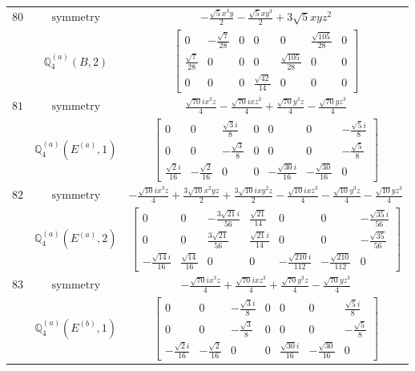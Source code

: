 \documentclass[fleqn,8pt,landscape]{jsarticle}
\begin{document}
\begin{longtable}{ccc}
$ 80 $ & $ \text{symmetry} $ & $ - \frac{\sqrt{5} x^{3} y}{2} - \frac{\sqrt{5} x y^{3}}{2} + 3 \sqrt{5} x y z^{2} $ \\
$  $ & $ \mathbb{Q}_{4}^{(a)}(B,2) $ & $ \begin{bmatrix} 0 & - \frac{\sqrt{7}}{28} & 0 & 0 & 0 & \frac{\sqrt{105}}{28} & 0 \\ \frac{\sqrt{7}}{28} & 0 & 0 & 0 & \frac{\sqrt{105}}{28} & 0 & 0 \\ 0 & 0 & 0 & \frac{\sqrt{42}}{14} & 0 & 0 & 0 \end{bmatrix} $ \\ \hline
$ 81 $ & $ \text{symmetry} $ & $ \frac{\sqrt{70} i x^{3} z}{4} - \frac{\sqrt{70} i x z^{3}}{4} + \frac{\sqrt{70} y^{3} z}{4} - \frac{\sqrt{70} y z^{3}}{4} $ \\
$  $ & $ \mathbb{Q}_{4}^{(a)}(E^{(a)},1) $ & $ \begin{bmatrix} 0 & 0 & \frac{\sqrt{3} i}{8} & 0 & 0 & 0 & - \frac{\sqrt{5} i}{8} \\ 0 & 0 & - \frac{\sqrt{3}}{8} & 0 & 0 & 0 & - \frac{\sqrt{5}}{8} \\ \frac{\sqrt{2} i}{16} & - \frac{\sqrt{2}}{16} & 0 & 0 & - \frac{\sqrt{30} i}{16} & - \frac{\sqrt{30}}{16} & 0 \end{bmatrix} $ \\ \hline
$ 82 $ & $ \text{symmetry} $ & $ - \frac{\sqrt{10} i x^{3} z}{4} + \frac{3 \sqrt{10} x^{2} y z}{2} + \frac{3 \sqrt{10} i x y^{2} z}{2} - \frac{\sqrt{10} i x z^{3}}{4} - \frac{\sqrt{10} y^{3} z}{4} - \frac{\sqrt{10} y z^{3}}{4} $ \\
$  $ & $ \mathbb{Q}_{4}^{(a)}(E^{(a)},2) $ & $ \begin{bmatrix} 0 & 0 & - \frac{3 \sqrt{21} i}{56} & \frac{\sqrt{21}}{14} & 0 & 0 & - \frac{\sqrt{35} i}{56} \\ 0 & 0 & \frac{3 \sqrt{21}}{56} & \frac{\sqrt{21} i}{14} & 0 & 0 & - \frac{\sqrt{35}}{56} \\ - \frac{\sqrt{14} i}{16} & \frac{\sqrt{14}}{16} & 0 & 0 & - \frac{\sqrt{210} i}{112} & - \frac{\sqrt{210}}{112} & 0 \end{bmatrix} $ \\ \hline
$ 83 $ & $ \text{symmetry} $ & $ - \frac{\sqrt{70} i x^{3} z}{4} + \frac{\sqrt{70} i x z^{3}}{4} + \frac{\sqrt{70} y^{3} z}{4} - \frac{\sqrt{70} y z^{3}}{4} $ \\
$  $ & $ \mathbb{Q}_{4}^{(a)}(E^{(b)},1) $ & $ \begin{bmatrix} 0 & 0 & - \frac{\sqrt{3} i}{8} & 0 & 0 & 0 & \frac{\sqrt{5} i}{8} \\ 0 & 0 & - \frac{\sqrt{3}}{8} & 0 & 0 & 0 & - \frac{\sqrt{5}}{8} \\ - \frac{\sqrt{2} i}{16} & - \frac{\sqrt{2}}{16} & 0 & 0 & \frac{\sqrt{30} i}{16} & - \frac{\sqrt{30}}{16} & 0 \end{bmatrix} $ \\ \hline

\end{longtable}
\end{document}
